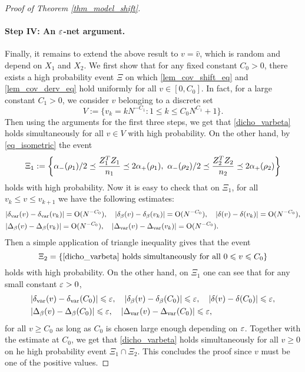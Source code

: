 \begin{proof}[Proof of Theorem \ref{thm_model_shift}]
\paragraph{Step IV: An $\e$-net argument.} Finally, it remains to extend the above result to $v=\hat v$, which is random and depend on $X_1$ and $X_2$. We first show that for any fixed constant $C_0>0$, there exists a high probability event $\Xi$ on which \eqref{lem_cov_shift_eq} and \eqref{lem_cov_derv_eq} hold uniformly for all $v\in [0, C_0]$. In fact, for a large constant $C_1>0$, we consider $v$ belonging to a discrete set 
$$V:=\{v_k = kN^{-C_1}: 1\le k \le C_0N^{C_1}+1\}.$$
Then using the arguments for the first three steps, we get that
\eqref{dicho_varbeta} holds simultaneously for all $v\in V$ with high probability. On the other hand, by \eqref{eq_isometric} the event
$$\Xi_1:=\left\{ \al_-(\rho_1)/2 \preceq  \frac{Z_1^T Z_1}{n_1}  \preceq   2\al_+(\rho_1) ,\  \al_-(\rho_2)/2 \preceq  \frac{Z_2^T Z_2}{n_2}  \preceq   2\al_+(\rho_2)\right\}$$
holds with high probability. Now it is easy to check that on $\Xi_1$, for all $v_k \le v\le v_{k+1}$ we have the following estimates:
\begin{align*}
& |\delta_{\vari}(v) -\delta_{\vari}(v_k)|=\OO(N^{-C_0}),\quad |\delta_{\beta}(v) -\delta_{\beta}(v_k)|=\OO(N^{-C_0}), \quad |\delta(v)-\delta(v_k)|=\OO(N^{-C_0}),\\
& |\Delta_{\beta}(v) -\Delta_{\beta}(v_k)|=\OO(N^{-C_0}),\quad |\Delta_{\vari}(v) -\Delta_{\vari}(v_k)|=\OO(N^{-C_0}).
\end{align*}
Then a simple application of triangle inequality gives that the event 
$$\Xi_2=\{\eqref{dicho_varbeta} \text{ holds simultaneously for all }0\le v \le C_0\}$$
holds with high probability. On the other hand, on $\Xi_1$ one can see that for any small constant $\e>0$,
\begin{align*}
& |\delta_{\vari}(v) -\delta_{\vari}(C_0)|\le \e,\quad |\delta_{\beta}(v) -\delta_{\beta}(C_0)|\le \e, \quad |\delta(v)-\delta(C_0)|\le \e,\\
& |\Delta_{\beta}(v) -\Delta_{\beta}(C_0)|\le \e,\quad |\Delta_{\vari}(v) -\Delta_{\vari}(C_0)|\le \e,
\end{align*}
for all $v\ge C_0$ as long as $C_0$ is chosen large enough depending on $\e$. Together with the estimate at $C_0$, we get that \eqref{dicho_varbeta} holds simultaneously for all $v\ge 0$ on he high probability event $\Xi_1\cap \Xi_2$. This concludes the proof since $v$ must be one of the positive values.
\end{proof}

